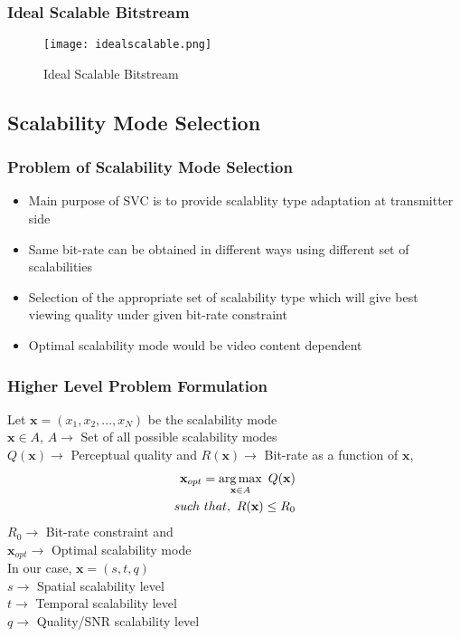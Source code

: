 \documentclass{beamer}
\begin{document}
\begin{frame}\frametitle{Ideal Scalable Bitstream}
  \begin{figure}
  \centering
  \texttt{[image: idealscalable.png]}
  \caption{Ideal Scalable Bitstream }
  \label{idealscalable}
  \end{figure}
\end{frame}

\subsection{Scalability Mode Selection}
\begin{frame}\frametitle{Problem of Scalability Mode Selection}
\begin{itemize}
\setlength\itemsep{1 em}
\item Main purpose of SVC is to provide scalablity type adaptation at transmitter side
\item Same bit-rate can be obtained in different ways using different set of scalabilities
\item Selection of the appropriate set of scalability type which will give best viewing quality under given bit-rate constraint
\item Optimal scalability mode would be video content dependent 
\end{itemize}
\end{frame}

\begin{frame}\frametitle{Higher Level Problem Formulation}
Let $\textbf{x} = (x_{1},x_{2},...,x_{N})$ be the scalability mode \\
$\textbf{x} \in A$,
$A \rightarrow$ Set of all possible scalability modes\\
$Q(\textbf{x}) \rightarrow$ Perceptual quality and $R(\textbf{x}) \rightarrow$  Bit-rate as a function of $\textbf{x}$,
\begin{align}
\textbf{x}_{opt} = \operatorname*{arg\,max}_{\textbf{x} \in A} \ Q(\textbf{x}) \notag \\
such \ that, \ R(\textbf{x}) \leq R_0
\end{align}
$R_0 \rightarrow$ Bit-rate constraint and \\
$\textbf{x}_{opt} \rightarrow$ Optimal scalability mode \\
In our case, $\textbf{x} = (s,t,q)$ \\
\hspace{19 mm} $s \rightarrow $ Spatial scalability level\\
\hspace{19 mm} $t \rightarrow $ Temporal scalability level\\
\hspace{19 mm} $q \rightarrow $ Quality/SNR scalability level
\end{frame}
\end{document}
